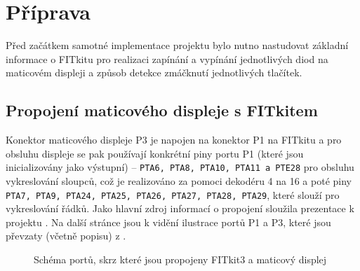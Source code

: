 \documentclass[14pt]{extarticle}
\begin{document}
    \section{Příprava}
    
    Před začátkem samotné implementace projektu bylo nutno nastudovat základní informace o FITkitu pro realizaci zapínání a vypínání jednotlivých diod na maticovém displeji a způsob detekce zmáčknutí jednotlivých tlačítek.
    
    \subsection{Propojení maticového displeje s FITkitem}
    Konektor maticového displeje P3 je napojen na konektor P1 na FITkitu a pro obsluhu displeje se pak používají konkrétní piny portu P1 (které jsou inicializovány jako výstupní) -- \texttt{PTA6, PTA8, PTA10, PTA11 a PTE28} pro obsluhu vykreslování sloupců, což je realizováno za pomoci dekodéru 4 na 16 a poté piny \texttt{PTA7, PTA9, PTA24, PTA25, PTA26, PTA27, PTA28, PTA29}, které slouží pro vykreslování řádků. Jako hlavní zdroj informací o propojení sloužila prezentace k projektu \cite{project-info}.
    Na další stránce jsou k vidění ilustrace portů P1 a P3, které jsou převzaty (včetně popisu) z \cite{project-info}.
    
\begin{figure}
    \centering
    \qquad
    \caption{Schéma portů, skrz které jsou propojeny FITkit3 a maticový displej}%
\end{figure}
    
\end{document}
